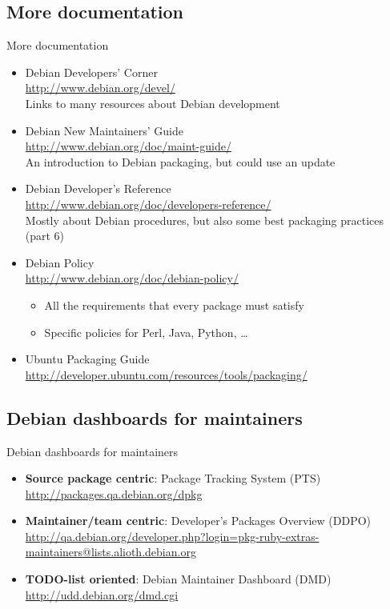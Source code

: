 \documentclass[10pt,final]{beamer}
\begin{document}
\subsection{More documentation}
\begin{frame}{More documentation}
  \begin{itemize}
  \item Debian Developers' Corner\\
    \url{http://www.debian.org/devel/}\\
    {\small Links to many resources about Debian development}
    \hbr
  \item Debian New Maintainers' Guide\\
    \url{http://www.debian.org/doc/maint-guide/}\\
    {\small An introduction to Debian packaging, but could use an update}
    \hbr
  \item Debian Developer's Reference\\
    \url{http://www.debian.org/doc/developers-reference/}\\
    {\small Mostly about Debian procedures, but also some best packaging practices (part 6)}
    \hbr
  \item Debian Policy\\
    \url{http://www.debian.org/doc/debian-policy/}\\
    
    {\small \begin{itemize}
      \item \small All the requirements that every package must satisfy
      \item \small Specific policies for Perl, Java, Python, \ldots
      \end{itemize}}
    \hbr
    
  \item Ubuntu Packaging Guide\\
    \url{http://developer.ubuntu.com/resources/tools/packaging/}
  \end{itemize}
\end{frame}

\subsection{Debian dashboards for maintainers}
\begin{frame}{Debian dashboards for maintainers}
  \begin{itemize}
	  \item \textbf{Source package centric}: Package Tracking System (PTS)\\
    \url{http://packages.qa.debian.org/dpkg}
    \br
  \item \textbf{Maintainer/team centric}: Developer's Packages Overview (DDPO)\\
    \url{http://qa.debian.org/developer.php?login=pkg-ruby-extras-maintainers@lists.alioth.debian.org}
    \br
  \item \textbf{TODO-list oriented}: Debian Maintainer Dashboard (DMD)\\
    \url{http://udd.debian.org/dmd.cgi}
  \end{itemize}
\end{frame}
\end{document}
